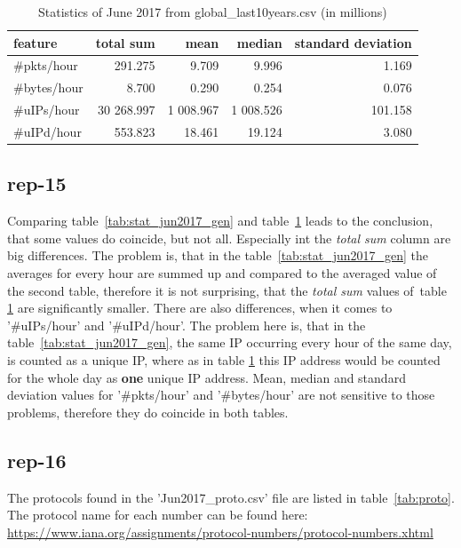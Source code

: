 \begin{table}[H]
\center
\begin{tabular}{lrrrr}
\toprule
feature & total sum & mean & median & standard deviation \\
\midrule
\#pkts/hour  &    291.275  &      9.709  &      9.996   &    1.169 \\
\#bytes/hour &      8.700  &      0.290  &      0.254   &    0.076 \\
\#uIPs/hour  & 30 268.997  &  1 008.967  &  1 008.526   &  101.158\\
\#uIPd/hour  &    553.823  &     18.461  &     19.124   &    3.080 \\
\bottomrule
\end{tabular}
\caption{Statistics of June 2017 from global\_last10years.csv (in millions)}
\label{tab:stat_jun2017_global}
\end{table}

\subsection*{rep-15}
Comparing table~\ref{tab:stat_jun2017_gen} and table~\ref{tab:stat_jun2017_global} leads to the conclusion, that some values do coincide, but not all. Especially int the \textit{total sum} column are big differences. The problem is, that in the table~\ref{tab:stat_jun2017_gen} the averages for every hour are summed up and compared to the averaged value of the second table, therefore it is not surprising, that the \textit{total sum} values of~table \ref{tab:stat_jun2017_global} are significantly smaller.
There are also differences, when it comes to '\#uIPs/hour' and '\#uIPd/hour'. The problem here is, that in the table~\ref{tab:stat_jun2017_gen}, the same IP occurring every hour of the same day, is counted as a unique IP, where as in table \ref{tab:stat_jun2017_global} this IP address would be counted for the whole day as \textbf{one} unique IP address.
Mean, median and standard deviation values for '\#pkts/hour' and '\#bytes/hour' are not sensitive to those problems, therefore they do coincide in both tables.

\subsection*{rep-16}
The protocols found in the 'Jun2017\_proto.csv' file are listed in table~\ref{tab:proto}. The protocol name for each number can be found here: \url{https://www.iana.org/assignments/protocol-numbers/protocol-numbers.xhtml}

